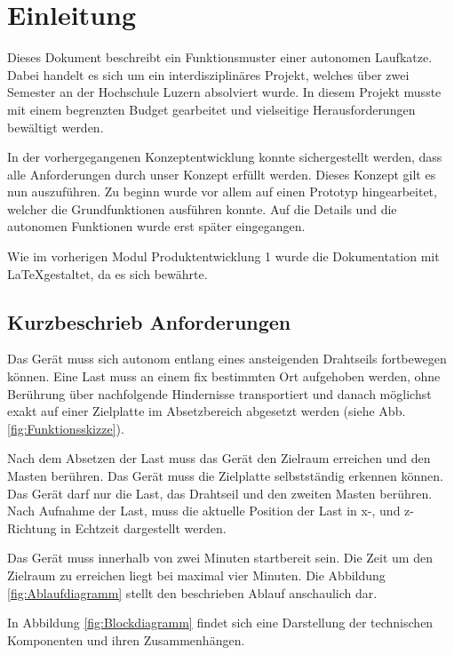 \documentclass[a4paper]{report}
\begin{document}
\newpage


\chapter{Einleitung}
\label{ch:Intro}
Dieses Dokument beschreibt ein Funktionsmuster einer autonomen Laufkatze. Dabei handelt es sich um ein interdisziplinäres Projekt, welches über zwei Semester an der Hochschule Luzern absolviert wurde. In diesem Projekt musste mit einem begrenzten Budget gearbeitet und vielseitige Herausforderungen bewältigt werden.

In der vorhergegangenen Konzeptentwicklung konnte sichergestellt werden, dass alle Anforderungen durch unser Konzept erfüllt werden. Dieses Konzept gilt es nun auszuführen. Zu beginn wurde vor allem auf einen Prototyp hingearbeitet, welcher die Grundfunktionen ausführen konnte. Auf die Details und die autonomen Funktionen wurde erst später eingegangen.

Wie im vorherigen Modul Produktentwicklung 1 wurde die Dokumentation mit \LaTeX gestaltet, da es sich bewährte.

\section{Kurzbeschrieb Anforderungen}
\label{sec:KurzAnforder}
Das Gerät muss sich autonom entlang eines ansteigenden Drahtseils fortbewegen können. Eine Last muss an einem fix bestimmten Ort aufgehoben werden, ohne Berührung über nachfolgende Hindernisse transportiert und danach möglichst exakt auf einer Zielplatte im Absetzbereich abgesetzt werden (siehe Abb.\ref{fig:Funktionsskizze}).

Nach dem Absetzen der Last muss das Gerät den Zielraum erreichen und den Masten berühren. Das Gerät muss die Zielplatte selbstständig erkennen können. Das Gerät darf nur die Last, das Drahtseil und den zweiten Masten berühren. Nach Aufnahme der Last, muss die aktuelle Position der Last in x-, und z-Richtung in Echtzeit dargestellt werden.

Das Gerät muss innerhalb von zwei Minuten startbereit sein. Die Zeit um den Zielraum zu erreichen liegt bei maximal vier Minuten. Die Abbildung \ref{fig:Ablaufdiagramm} stellt den beschrieben Ablauf anschaulich dar.

In Abbildung \ref{fig:Blockdiagramm} findet sich eine Darstellung der technischen Komponenten und ihren Zusammenhängen.
\end{document}
